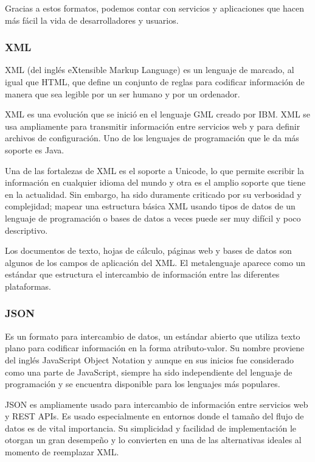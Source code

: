 Gracias a estos formatos, podemos contar con servicios y aplicaciones que hacen más fácil la vida de desarrolladores y usuarios.

\subsubsection{XML}

XML (del inglés eXtensible Markup Language) es un lenguaje de marcado, al igual que HTML, que define un conjunto de reglas para codificar información de manera que sea legible por un ser humano y por un ordenador.

XML es una evolución que se inició en el lenguaje GML creado por IBM. XML se usa ampliamente para transmitir información entre servicios web y para definir archivos de configuración. Uno de los lenguajes de programación que le da más soporte es Java.

Una de las fortalezas de XML es el soporte a Unicode, lo que permite escribir la información en cualquier idioma del mundo y otra es el amplio soporte que tiene en la actualidad. Sin embargo, ha sido duramente criticado por su verbosidad y complejidad; mapear una estructura básica XML usando tipos de datos de un lenguaje de programación o bases de datos a veces puede ser muy difícil y poco descriptivo.

Los documentos de texto, hojas de cálculo, páginas web y bases de datos son algunos de los campos de aplicación del XML. El metalenguaje aparece como un estándar que estructura el intercambio de información entre las diferentes plataformas.

\subsubsection{JSON}

Es un formato para intercambio de datos, un estándar abierto que utiliza texto plano para codificar información en la forma atributo-valor. Su nombre proviene del inglés JavaScript Object Notation y aunque en sus inicios fue considerado como una parte de JavaScript, siempre ha sido independiente del lenguaje de programación y se encuentra disponible para los lenguajes más populares.

JSON es ampliamente usado para intercambio de información entre servicios web y REST APIs. Es usado especialmente en entornos donde el tamaño del flujo de datos es de vital importancia. Su simplicidad y facilidad de implementación le otorgan un gran desempeño y lo convierten en una de las alternativas ideales al momento de reemplazar XML.

